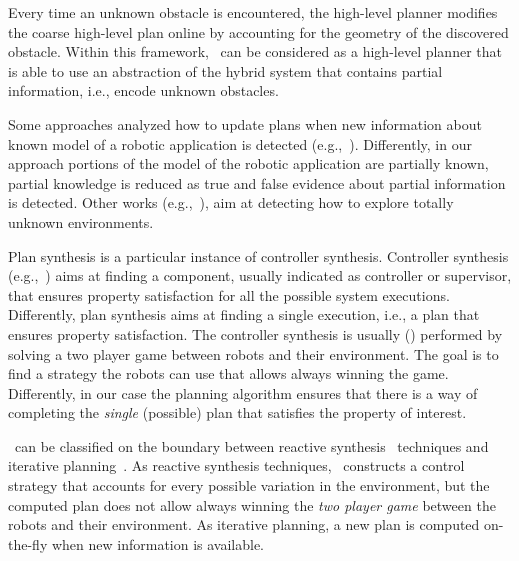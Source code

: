 \begin{enumerate*}
Every time an unknown obstacle is encountered, the high-level planner modifies the coarse high-level plan online by accounting for the geometry of the discovered obstacle. 
Within this framework, \toolName\ can be considered as a high-level planner that is able to use an abstraction of the hybrid system that contains partial information, i.e., encode unknown obstacles.
\item Some  approaches  analyzed how to update plans when new information about known model of a robotic application is detected (e.g.,~\cite{guo2015multi}). 
Differently, in our approach portions of the model of the robotic application are partially known,  partial knowledge is reduced as true and false evidence about partial information is detected.
Other works (e.g.,~\cite{7139310}), aim at detecting how to explore totally unknown environments.
\item 
Plan synthesis is a particular instance of controller synthesis. 
Controller  synthesis (e.g.,~\cite{cassandras2009introduction,D'ippolito:2013:SNE:2430536.2430543}) aims at finding a component, usually indicated as controller or supervisor, that ensures property satisfaction for all the possible system executions.
Differently, plan synthesis aims at finding a single execution, i.e., a plan that ensures property satisfaction.
The controller synthesis  is usually (\cite{kress2009temporal,wongpiromsarn2009receding,chen2012ltl,livingston2012backtracking,guo2013revising}) performed by solving a two player game between robots and their environment.
The goal is to find a strategy the robots can use that allows always winning the game.
Differently, in our case the planning algorithm ensures that there is a way of completing the \emph{single} (possible) plan that satisfies the property of interest. 
\item \toolName\ can be classified on the boundary between reactive synthesis~\cite{chen2012ltl,livingston2012backtracking,thomas2002automata} techniques and iterative planning~\cite{guo2013revising,maly2013iterative}. 
As reactive synthesis techniques, \toolName\ constructs a control strategy that accounts for every possible variation in the environment, but the computed plan does not allow always winning the  \emph{two player game} between the robots and their environment.
As  iterative planning, a new plan is computed on-the-fly when new information is available.
\end{enumerate*}
